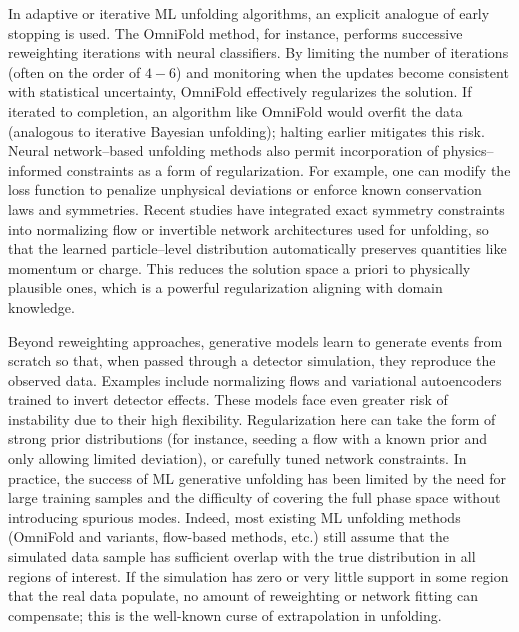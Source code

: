         In adaptive or iterative ML unfolding algorithms, an explicit analogue of early stopping is used.
        The OmniFold method, for instance, performs successive reweighting iterations with neural classifiers.\kd{}  By limiting the number of iterations (often on the order of \(4-6\)) and monitoring when the updates become consistent with statistical uncertainty, OmniFold effectively regularizes the solution.\kd{}
        If iterated to completion, an algorithm like OmniFold would overfit the data (analogous to iterative Bayesian unfolding); halting earlier mitigates this risk.\kd{}
        Neural network--based unfolding methods also permit incorporation of physics--informed constraints as a form of regularization.
        For example, one can modify the loss function to penalize unphysical deviations or enforce known conservation laws and symmetries.
        Recent studies have integrated exact symmetry constraints into normalizing flow or invertible network architectures used for unfolding, so that the learned particle--level distribution automatically preserves quantities like momentum or charge.
        This reduces the solution space a priori to physically plausible ones, which is a powerful regularization aligning with domain knowledge.

        Beyond reweighting approaches, generative models learn to generate events from scratch so that, when passed through a detector simulation, they reproduce the observed data.\kd{}
        Examples include normalizing flows and variational autoencoders trained to invert detector effects.
        These models face even greater risk of instability due to their high flexibility.
        Regularization here can take the form of strong prior distributions (for instance, seeding a flow with a known prior and only allowing limited deviation), or carefully tuned network constraints.
        In practice, the success of ML generative unfolding has been limited by the need for large training samples and the difficulty of covering the full phase space without introducing spurious modes.
        Indeed, most existing ML unfolding methods (OmniFold and variants, flow-based methods, etc.) still assume that the simulated data sample has sufficient overlap with the true distribution in all regions of interest.\kd{}
        If the simulation has zero or very little support in some region that the real data populate, no amount of reweighting or network fitting can compensate; this is the well-known curse of extrapolation in unfolding.

